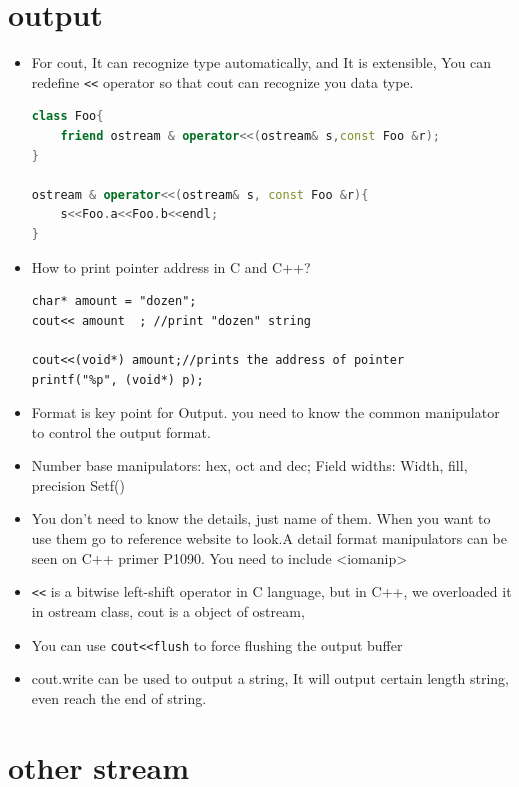 \documentclass[a4paper,11pt,twoside]{book}
\begin{document}
\section{output}

\begin{itemize}
	\item For cout, It can recognize type automatically, and It is extensible, You can redefine \verb=<<= operator so that cout can recognize you data type.
\begin{lstlisting}[frame=single, language=c++]
class Foo{
	friend ostream & operator<<(ostream& s,const Foo &r);
}
	
ostream & operator<<(ostream& s, const Foo &r){
	s<<Foo.a<<Foo.b<<endl;
}
\end{lstlisting}
	
	\item  How to print pointer address in C and C++?
\begin{lstlisting}[numbers=none]
char* amount = "dozen";
cout<< amount  ; //print "dozen" string
	
cout<<(void*) amount;//prints the address of pointer
printf("%p", (void*) p);
\end{lstlisting}
	
	
	\item Format is key point for Output. you need to know the common manipulator to control the output format.
	\item Number base manipulators:  hex, oct  and dec; Field widths: Width,  fill, precision Setf()
	\item You don't need to know the details, just name of them. When you want to use them go to reference website to look.A detail format manipulators can be seen on C++ primer P1090. You need to include <iomanip>
	
	\item \verb=<<= is a bitwise left-shift operator in C language, but in C++, we overloaded it in ostream class, cout is a object of ostream,
	
	\item You can use \verb=cout<<flush= to force flushing the output buffer
	\item cout.write can be used to output a string, It will output certain length string, even reach the end of string.
	
	
\end{itemize}

\section{other stream}
\end{document}
